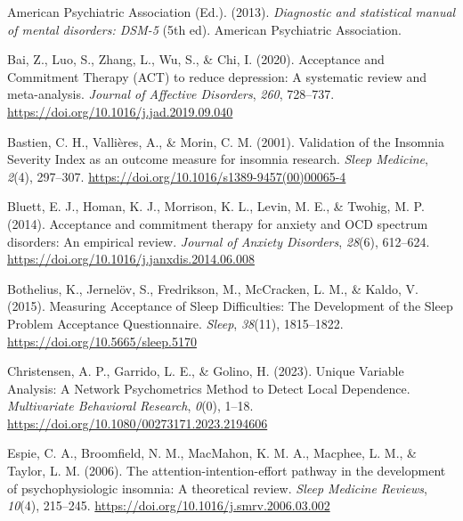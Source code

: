 \documentclass[
  letterpaper,
  DIV=11,
  numbers=noendperiod]{scrreprt}
\newlength{\cslhangindent}
\newlength{\cslentryspacingunit} %
\newenvironment{CSLReferences}[2] %
 {%
  \setlength{\parindent}{0pt}
  \ifodd #1
  \let\oldpar\par
  \def\par{\hangindent=\cslhangindent\oldpar}
  \fi
  \setlength{\parskip}{#2\cslentryspacingunit}
 }%
 {}
\begin{document}
\hypertarget{refs}{}
\begin{CSLReferences}{1}{0}
\leavevmode{}%
American Psychiatric Association (Ed.). (2013). \emph{Diagnostic and
statistical manual of mental disorders: {DSM}-5} (5th ed). {American
Psychiatric Association}.

\leavevmode{}%
Bai, Z., Luo, S., Zhang, L., Wu, S., \& Chi, I. (2020). Acceptance and
{Commitment Therapy} ({ACT}) to reduce depression: {A} systematic review
and meta-analysis. \emph{Journal of Affective Disorders}, \emph{260},
728--737. \url{https://doi.org/10.1016/j.jad.2019.09.040}

\leavevmode{}%
Bastien, C. H., Vallières, A., \& Morin, C. M. (2001). Validation of the
{Insomnia Severity Index} as an outcome measure for insomnia research.
\emph{Sleep Medicine}, \emph{2}(4), 297--307.
\url{https://doi.org/10.1016/s1389-9457(00)00065-4}

\leavevmode{}%
Bluett, E. J., Homan, K. J., Morrison, K. L., Levin, M. E., \& Twohig,
M. P. (2014). Acceptance and commitment therapy for anxiety and {OCD}
spectrum disorders: {An} empirical review. \emph{Journal of Anxiety
Disorders}, \emph{28}(6), 612--624.
\url{https://doi.org/10.1016/j.janxdis.2014.06.008}

\leavevmode{}%
Bothelius, K., Jernelöv, S., Fredrikson, M., McCracken, L. M., \& Kaldo,
V. (2015). Measuring {Acceptance} of {Sleep Difficulties}: {The
Development} of the {Sleep Problem Acceptance Questionnaire}.
\emph{Sleep}, \emph{38}(11), 1815--1822.
\url{https://doi.org/10.5665/sleep.5170}

\leavevmode{}%
Christensen, A. P., Garrido, L. E., \& Golino, H. (2023). Unique
{Variable Analysis}: {A Network Psychometrics Method} to {Detect Local
Dependence}. \emph{Multivariate Behavioral Research}, \emph{0}(0),
1--18. \url{https://doi.org/10.1080/00273171.2023.2194606}

\leavevmode{}%
Espie, C. A., Broomfield, N. M., MacMahon, K. M. A., Macphee, L. M., \&
Taylor, L. M. (2006). The attention-intention-effort pathway in the
development of psychophysiologic insomnia: A theoretical review.
\emph{Sleep Medicine Reviews}, \emph{10}(4), 215--245.
\url{https://doi.org/10.1016/j.smrv.2006.03.002}


\end{CSLReferences}
\end{document}
